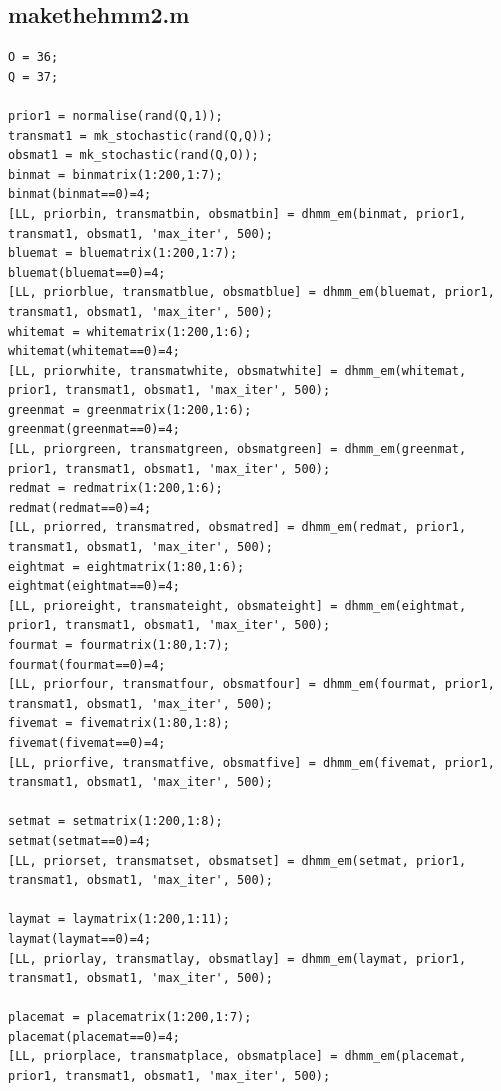 \documentclass[a4paper]{article}
\begin{document}
\subsection{makethehmm2.m}
\label{makethehmm2.m}
\begin{lstlisting}[style=myMatlabstyle]
O = 36;
Q = 37;

prior1 = normalise(rand(Q,1));
transmat1 = mk_stochastic(rand(Q,Q));
obsmat1 = mk_stochastic(rand(Q,O));
binmat = binmatrix(1:200,1:7);
binmat(binmat==0)=4;
[LL, priorbin, transmatbin, obsmatbin] = dhmm_em(binmat, prior1, transmat1, obsmat1, 'max_iter', 500);
bluemat = bluematrix(1:200,1:7);
bluemat(bluemat==0)=4;
[LL, priorblue, transmatblue, obsmatblue] = dhmm_em(bluemat, prior1, transmat1, obsmat1, 'max_iter', 500);
whitemat = whitematrix(1:200,1:6);
whitemat(whitemat==0)=4;
[LL, priorwhite, transmatwhite, obsmatwhite] = dhmm_em(whitemat, prior1, transmat1, obsmat1, 'max_iter', 500);
greenmat = greenmatrix(1:200,1:6);
greenmat(greenmat==0)=4;
[LL, priorgreen, transmatgreen, obsmatgreen] = dhmm_em(greenmat, prior1, transmat1, obsmat1, 'max_iter', 500);
redmat = redmatrix(1:200,1:6);
redmat(redmat==0)=4;
[LL, priorred, transmatred, obsmatred] = dhmm_em(redmat, prior1, transmat1, obsmat1, 'max_iter', 500);
eightmat = eightmatrix(1:80,1:6);
eightmat(eightmat==0)=4;
[LL, prioreight, transmateight, obsmateight] = dhmm_em(eightmat, prior1, transmat1, obsmat1, 'max_iter', 500);
fourmat = fourmatrix(1:80,1:7);
fourmat(fourmat==0)=4;
[LL, priorfour, transmatfour, obsmatfour] = dhmm_em(fourmat, prior1, transmat1, obsmat1, 'max_iter', 500);
fivemat = fivematrix(1:80,1:8);
fivemat(fivemat==0)=4;
[LL, priorfive, transmatfive, obsmatfive] = dhmm_em(fivemat, prior1, transmat1, obsmat1, 'max_iter', 500);

setmat = setmatrix(1:200,1:8);
setmat(setmat==0)=4;
[LL, priorset, transmatset, obsmatset] = dhmm_em(setmat, prior1, transmat1, obsmat1, 'max_iter', 500);

laymat = laymatrix(1:200,1:11);
laymat(laymat==0)=4;
[LL, priorlay, transmatlay, obsmatlay] = dhmm_em(laymat, prior1, transmat1, obsmat1, 'max_iter', 500);

placemat = placematrix(1:200,1:7);
placemat(placemat==0)=4;
[LL, priorplace, transmatplace, obsmatplace] = dhmm_em(placemat, prior1, transmat1, obsmat1, 'max_iter', 500);
\end{lstlisting}
\end{document}
